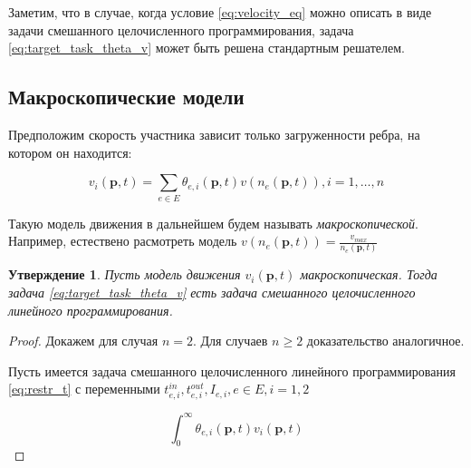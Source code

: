 \documentclass[12pt, a4paper]{article}
\newtheorem{state}[theorem]{Утверждение}
\begin{document}
Заметим, что в случае, когда условие \eqref{eq:velocity_eq} можно описать в виде задачи смешанного целочисленного программирования, 
задача \eqref{eq:target_task_theta_v} может быть решена стандартным решателем.

\subsection*{Макроскопические модели}

Предположим скорость участника зависит только загруженности ребра, на котором он находится:

\begin{equation}
	\label{eq:velocity_eq_macro}
	 v_i(\textbf{p}, t) = \sum \limits _{e \in E} \theta_{e, i} (\textbf{p}, t) v (n_e (\textbf{p}, t)),  i = 1, \dots, n
\end{equation}

Такую модель движения в дальнейшем будем называть \textit{макроскопической}.
Например, естествено расмотреть модель $ v (n_e (\textbf{p}, t)) = \frac{v_{max}}{n_e (\textbf{p}, t)}$

\begin{state}
	Пусть модель движения $ v_i(\textbf{p}, t)$ макроскопическая. Тогда задача \eqref{eq:target_task_theta_v} есть задача смешанного целочисленного линейного программирования.
\end{state}

\begin{proof}
	Докажем для случая $n = 2$. Для случаев $n \ge 2$ доказательство аналогичное.
	
	Пусть имеется задача смешанного целочисленного линейного программирования \eqref{eq:restr_t} с переменными $t_{e, i}^{in}, t_{e, i}^{out}, I_{e, i}, e \in E, i = 1, 2$
	
	$$\int_{0}^{\infty} \theta_{e, i} (\textbf{p}, t) v_i(\textbf{p}, t)$$
\end{proof}
\end{document}
